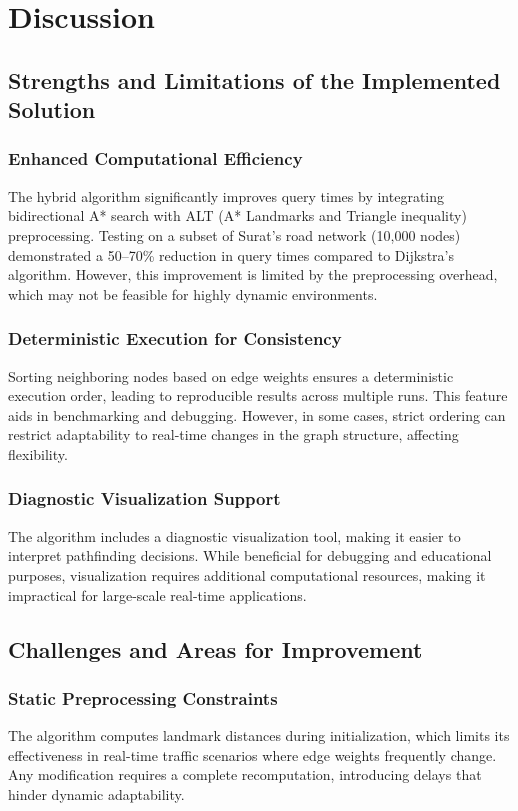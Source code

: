 \chapter{Discussion}

\section{Strengths and Limitations of the Implemented Solution}

\subsection{Enhanced Computational Efficiency}
The hybrid algorithm significantly improves query times by integrating bidirectional A* search with ALT (A* Landmarks and Triangle inequality) preprocessing. Testing on a subset of Surat’s road network (10,000 nodes) demonstrated a 50–70\% reduction in query times compared to Dijkstra’s algorithm. However, this improvement is limited by the preprocessing overhead, which may not be feasible for highly dynamic environments.

\subsection{Deterministic Execution for Consistency}
Sorting neighboring nodes based on edge weights ensures a deterministic execution order, leading to reproducible results across multiple runs. This feature aids in benchmarking and debugging. However, in some cases, strict ordering can restrict adaptability to real-time changes in the graph structure, affecting flexibility.

\subsection{Diagnostic Visualization Support}
The algorithm includes a diagnostic visualization tool, making it easier to interpret pathfinding decisions. While beneficial for debugging and educational purposes, visualization requires additional computational resources, making it impractical for large-scale real-time applications.

\section{Challenges and Areas for Improvement}

\subsection{Static Preprocessing Constraints}
The algorithm computes landmark distances during initialization, which limits its effectiveness in real-time traffic scenarios where edge weights frequently change. Any modification requires a complete recomputation, introducing delays that hinder dynamic adaptability.

